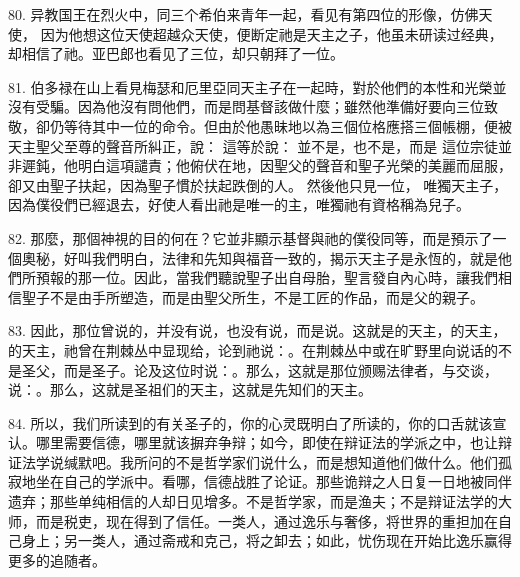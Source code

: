 80. 异教国王在烈火中，同三个希伯来青年一起，看见有第四位的形像，仿佛天使， 因为他想这位天使超越众天使，便断定祂是天主之子，他虽未研读过经典，却相信了祂。亚巴郎也看见了三位，却只朝拜了一位。\par

81. 伯多禄在山上看見梅瑟和厄里亞同天主子在一起時，對於他們的本性和光榮並沒有受騙。因為他沒有問他們，而是問基督該做什麼；雖然他準備好要向三位致敬，卻仍等待其中一位的命令。但由於他愚昧地以為三個位格應搭三個帳棚，便被天主聖父至尊的聲音所糾正，說： 這等於說：  並不是，也不是，而是 這位宗徒並非遲鈍，他明白這項譴責；他俯伏在地，因聖父的聲音和聖子光榮的美麗而屈服，卻又由聖子扶起，因為聖子慣於扶起跌倒的人。 然後他只見一位， 唯獨天主子，因為僕役們已經退去，好使人看出祂是唯一的主，唯獨祂有資格稱為兒子。\par

82. 那麼，那個神視的目的何在？它並非顯示基督與祂的僕役同等，而是預示了一個奧秘，好叫我們明白，法律和先知與福音一致的，揭示天主子是永恆的，就是他們所預報的那一位。因此，當我們聽說聖子出自母胎，聖言發自內心時，讓我們相信聖子不是由手所塑造，而是由聖父所生，不是工匠的作品，而是父的親子。\par

83. 因此，那位曾说的，并没有说，也没有说，而是说。这就是的天主，的天主，的天主，祂曾在荆棘丛中显现给，论到祂说：。在荆棘丛中或在旷野里向说话的不是圣父，而是圣子。论及这位时说：。那么，这就是那位颁赐法律者，与交谈，说：。那么，这就是圣祖们的天主，这就是先知们的天主。\par

84. 所以，我们所读到的有关圣子的，你的心灵既明白了所读的，你的口舌就该宣认。哪里需要信德，哪里就该摒弃争辩；如今，即使在辩证法的学派之中，也让辩证法学说缄默吧。我所问的不是哲学家们说什么，而是想知道他们做什么。他们孤寂地坐在自己的学派中。看哪，信德战胜了论证。那些诡辩之人日复一日地被同伴遗弃；那些单纯相信的人却日见增多。不是哲学家，而是渔夫；不是辩证法学的大师，而是税吏，现在得到了信任。一类人，通过逸乐与奢侈，将世界的重担加在自己身上；另一类人，通过斋戒和克己，将之卸去；如此，忧伤现在开始比逸乐赢得更多的追随者。\par

